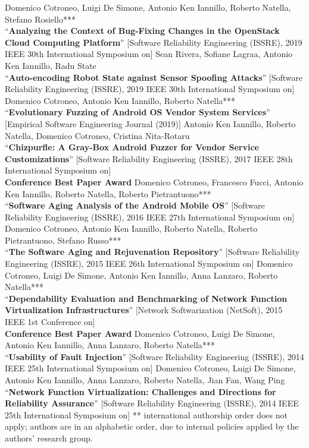 \documentclass[margin,line]{resume}
\begin{document}
\begin{resume}
\filbreak
Domenico Cotroneo, Luigi De Simone, Antonio Ken Iannillo, Roberto Natella, Stefano Rosiello***\\
``\textbf{Analyzing the Context of Bug-Fixing Changes in the OpenStack Cloud Computing Platform}''
[Software Reliability Engineering (ISSRE), 2019 IEEE 30th International Symposium on]
\filbreak
Sean Rivera, Sofiane Lagraa, Antonio Ken Iannillo, Radu State\\
``\textbf{Auto-encoding Robot State against Sensor Spoofing Attacks}''
[Software Reliability Engineering (ISSRE), 2019 IEEE 30th International Symposium on]
\filbreak
Domenico Cotroneo, Antonio Ken Iannillo, Roberto Natella***\\
``\textbf{Evolutionary Fuzzing of Android OS Vendor System Services}''
[Empirical Software Engineering Journal (2019)]
\filbreak
Antonio Ken Iannillo, Roberto Natella, Domenico Cotroneo, Cristina Nita-Rotaru\\
``\textbf{Chizpurfle: A Gray-Box Android Fuzzer for Vendor Service Customizations}''
[Software Reliability Engineering (ISSRE), 2017 IEEE 28th International Symposium on]\\\textbf{Conference Best Paper Award}
\filbreak
Domenico Cotroneo, Francesco Fucci, Antonio Ken Iannillo, Roberto Natella, Roberto Pietrantuono***\\
``\textbf{Software Aging Analysis of the Android Mobile OS}''
[Software Reliability Engineering (ISSRE), 2016 IEEE 27th International Symposium on]
\filbreak
Domenico Cotroneo, Antonio Ken Iannillo, Roberto Natella, Roberto Pietrantuono, Stefano Russo***\\
``\textbf{The Software Aging and Rejuvenation Repository}''
[Software Reliability Engineering (ISSRE), 2015 IEEE 26th International Symposium on]
\filbreak
Domenico Cotroneo, Luigi De Simone, Antonio Ken Iannillo, Anna Lanzaro, Roberto Natella***\\
``\textbf{Dependability Evaluation and Benchmarking of Network Function Virtualization Infrastructures}''
[Network Softwarization (NetSoft), 2015 IEEE 1st Conference on]\\\textbf{Conference Best Paper Award}
\filbreak
Domenico Cotroneo, Luigi De Simone, Antonio Ken Iannillo, Anna Lanzaro, Roberto Natella***\\
``\textbf{Usability of Fault Injection}''
[Software Reliability Engineering (ISSRE), 2014 IEEE 25th International Symposium on]
\filbreak
Domenico Cotroneo, Luigi De Simone, Antonio Ken Iannillo, Anna Lanzaro, Roberto Natella, Jian Fan, Wang Ping\\
``\textbf{Network Function Virtualization: Challenges and Directions for Reliability Assurance}''
[Software Reliability Engineering (ISSRE), 2014 IEEE 25th International Symposium on]
\filbreak
{\footnotesize*** international authorship order does not apply; authors are in an alphabetic order, due to internal policies applied by the authors' research group.}







\end{resume}
\end{document}
